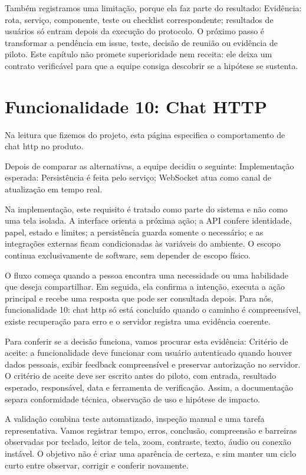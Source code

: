\documentclass[12pt,oneside,a4paper,article]{abntex2}
\begin{document}
Também registramos uma limitação, porque ela faz parte do resultado: Evidência: rota, serviço, componente, teste ou checklist correspondente; resultados de usuários só entram depois da execução do protocolo. O próximo passo é transformar a pendência em issue, teste, decisão de reunião ou evidência de piloto. Este capítulo não promete superioridade nem receita: ele deixa um contrato verificável para que a equipe consiga descobrir se a hipótese se sustenta.

\section{Funcionalidade 10: Chat HTTP}
Na leitura que fizemos do projeto, esta página especifica o comportamento de chat http no produto.

Depois de comparar as alternativas, a equipe decidiu o seguinte: Implementação esperada: Persistência é feita pelo serviço; WebSocket atua como canal de atualização em tempo real.

Na implementação, este requisito é tratado como parte do sistema e não como uma tela isolada. A interface orienta a próxima ação; a API confere identidade, papel, estado e limites; a persistência guarda somente o necessário; e as integrações externas ficam condicionadas às variáveis do ambiente. O escopo continua exclusivamente de software, sem depender de escopo físico.

O fluxo começa quando a pessoa encontra uma necessidade ou uma habilidade que deseja compartilhar. Em seguida, ela confirma a intenção, executa a ação principal e recebe uma resposta que pode ser consultada depois. Para nós, funcionalidade 10: chat http só está concluído quando o caminho é compreensível, existe recuperação para erro e o servidor registra uma evidência coerente.

Para conferir se a decisão funciona, vamos procurar esta evidência: Critério de aceite: a funcionalidade deve funcionar com usuário autenticado quando houver dados pessoais, exibir feedback compreensível e preservar autorização no servidor. O critério de aceite deve ser escrito antes do piloto, com entrada, resultado esperado, responsável, data e ferramenta de verificação. Assim, a documentação separa conformidade técnica, observação de uso e hipótese de impacto.

A validação combina teste automatizado, inspeção manual e uma tarefa representativa. Vamos registrar tempo, erros, conclusão, compreensão e barreiras observadas por teclado, leitor de tela, zoom, contraste, texto, áudio ou conexão instável. O objetivo não é criar uma aparência de certeza, e sim manter um ciclo curto entre observar, corrigir e conferir novamente.
\end{document}
